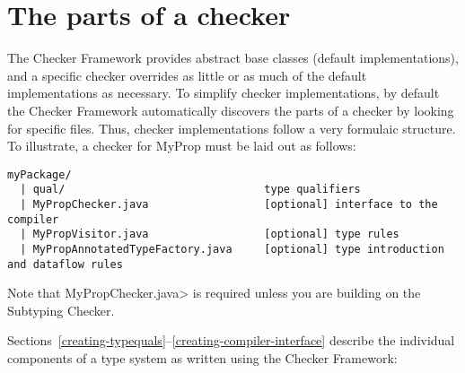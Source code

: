 \section{The parts of a checker\label{creating-parts-of-a-checker}}

The Checker Framework provides abstract base classes (default
implementations), and a specific checker overrides as little or as much of
the default implementations as necessary.
To simplify checker implementations, by default the Checker Framework
automatically discovers the parts of a checker by looking for specific files.
Thus, checker implementations follow a very formulaic structure.
To illustrate, a checker for MyProp must be laid out as follows:
%
\begin{Verbatim}
myPackage/
  | qual/                               type qualifiers
  | MyPropChecker.java                  [optional] interface to the compiler
  | MyPropVisitor.java                  [optional] type rules
  | MyPropAnnotatedTypeFactory.java     [optional] type introduction and dataflow rules
\end{Verbatim}
%
Note that \<MyPropChecker.java> is required unless you are building on the
Subtyping Checker.

Sections~\ref{creating-typequals}--\ref{creating-compiler-interface} describe
the individual components of a type system as written using the Checker
Framework:

